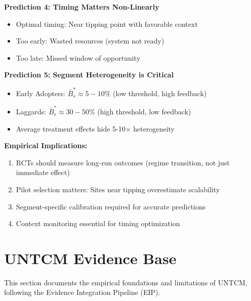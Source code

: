 \begin{tcolorbox}[colback=purple!5!white, colframe=purple!75!black,
    title=\textbf{Key Predictions from UNTCM}]
\textbf{Prediction 4: Timing Matters Non-Linearly}
\begin{itemize}[nosep]
\item Optimal timing: Near tipping point with favorable context
\item Too early: Wasted resources (system not ready)
\item Too late: Missed window of opportunity
\end{itemize}

\textbf{Prediction 5: Segment Heterogeneity is Critical}
\begin{itemize}[nosep]
\item Early Adopters: $\bar{B}_s^* \approx 5-10\%$ (low threshold, high feedback)
\item Laggards: $\bar{B}_s^* \approx 30-50\%$ (high threshold, low feedback)
\item Average treatment effects hide 5-10$\times$ heterogeneity
\end{itemize}

\end{tcolorbox}

\textbf{Empirical Implications:}
\begin{enumerate}[nosep]
\item RCTs should measure long-run outcomes (regime transition, not just immediate effect)
\item Pilot selection matters: Sites near tipping overestimate scalability
\item Segment-specific calibration required for accurate predictions
\item Context monitoring essential for timing optimization
\end{enumerate}


\section{UNTCM Evidence Base}
\label{sec:untcm-evidence}

This section documents the empirical foundations and limitations of UNTCM, following the Evidence Integration Pipeline (EIP).

